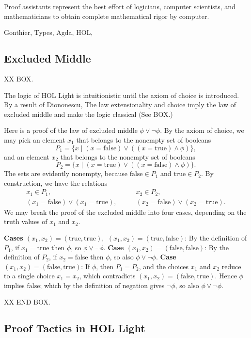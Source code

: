 \documentclass{llncs}
\def\true{\text{true}}
\def\false{\text{false}}
\begin{document}
Proof assistants represent the best effort of logicians, computer scientists, and mathematicians
to obtain complete mathematical rigor by computer.

Gonthier, Types, Agda, HOL,


\subsection{Excluded Middle}

XX BOX.

The logic of HOL Light is intuitionistic until the axiom of choice is introduced.
By a result of Diononescu,
The law extensionality and choice imply the law of excluded middle and make
the logic classical (See BOX.) \cite{Bee}

Here is a proof of the law of excluded middle $\phi\lor \lnot\phi$.  By
the axiom of choice, we may pick an element $x_1$ that belongs to the nonempty set
of booleans
\[
P_1 = \{ x \mid (x = \text{false}) \lor ((x = \text{true}) \land \phi)\},
\]
and an element $x_2$ that belongs to the nonempty set of booleans
\[
P_2  = \{x \mid (x = \text{true}) \lor ((x = \text{false}) \land \phi)\}.
\]
The sets are evidently nonempty, because $\false\in P_1$ and $\true\in P_2$.
By construction, we have the relations
\begin{align*}
x_1\in P_1,&\qquad x_2\in P_2,\\
(x_1=\text{false})\lor (x_1 = \text{true}), &\qquad (x_2=\text{false})\lor (x_2 = \text{true}). 
\end{align*}
We may break the proof of the excluded middle into four cases, depending on the
truth values of $x_1$ and $x_2$.

{\bf Cases $(x_1,x_2)=(\true,\true),$ $(x_1,x_2)=(\true,\false)$}: 
By the definition of $P_1$, if $x_1 = \true$ then $\phi$, so $\phi\lor \lnot\phi$.
{\bf Case $(x_1,x_2)=(\false,\false)$}: By the definition of $P_2$,
if $x_2=\false$ then $\phi$, so also $\phi\lor\lnot\phi$.
{\bf Case $(x_1,x_2)=(\false,\true)$}:  If $\phi$, then  $P_1=P_2$, and the choices
$x_1$ and $x_2$ reduce to a single choice $x_1=x_2$, which contradicts $(x_1,x_2)=(\false,\true)$.  Hence $\phi$ implies $\false$; 
which by the definition of negation gives $\lnot\phi$, so also $\phi\lor\lnot\phi$.

XX END BOX.



\subsection{Proof Tactics in HOL Light}
\end{document}

